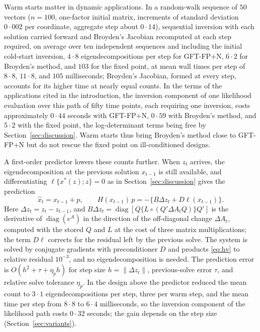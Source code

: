 \documentclass[11pt]{article}
\newcommand{\diag}{\operatorname{diag}}
\begin{document}
Warm starts matter in dynamic applications. In a random-walk sequence of $50$
vectors ($n=100$, one-factor initial matrix, increments of standard
deviation $0{\cdot}002$ per coordinate, aggregate step about
$0{\cdot}14$), sequential inversion with each solution carried
forward and Broyden's Jacobian recomputed at each step required, on
average over ten independent sequences and including the initial
cold-start inversion,
$4{\cdot}8$ eigendecompositions per step for GFT-FP+N, $6{\cdot}2$
for Broyden's method, and $103$ for the fixed point, at mean wall
times per step of $8{\cdot}8$, $11{\cdot}8$, and $105$ milliseconds;
Broyden's Jacobian, formed at every step, accounts for its higher time
at nearly equal counts. In the terms of the applications cited in the
introduction, the inversion component of one likelihood evaluation
over this path of fifty time points, each requiring one inversion,
costs approximately $0{\cdot}44$ seconds with GFT-FP+N, $0{\cdot}59$
with Broyden's method, and $5{\cdot}2$ with the fixed point, the
log-determinant terms being free by Section~\ref{sec:discussion}.
Warm starts thus bring Broyden's method close to GFT-FP+N but do not
rescue the fixed point on ill-conditioned designs.

A first-order predictor lowers these counts further. When $z_t$
arrives, the eigendecomposition at the previous solution $x_{t-1}$ is
still available, and differentiating $\ell\{x^{\ast}(z);z\}=0$ as in
Section~\ref{sec:discussion} gives the prediction
\begin{equation}\label{eq:pred}
\hat{x}_t=x_{t-1}+p,\qquad
H(x_{t-1})\,p=-\{B\Delta z_t+D\ell(x_{t-1})\}.
\end{equation}
Here $\Delta z_t=z_t-z_{t-1}$, and
$B\Delta z_t=\diag[Q\{L\circ(Q'\Delta A_tQ)\}Q']$ is the derivative of
$\diag(e^{A})$ in the direction of the off-diagonal change
$\Delta A_t$, computed with the stored $Q$ and $L$ at the cost of three
matrix multiplications; the term $D\ell$ corrects for the residual
left by the previous solve. The system is solved by conjugate
gradients with preconditioner $D$ and products \eqref{eq:hv} to
relative residual $10^{-3}$, and no eigendecomposition is needed. The
prediction error is $O(h^{2}+\tau+\eta_ph)$ for step size
$h=\|\Delta z_t\|$, previous-solve error $\tau$, and relative solve
tolerance $\eta_p$. In the design above the predictor reduced the mean
count to $3{\cdot}1$ eigendecompositions per step, three per warm
step, and the mean time per step from $8{\cdot}8$ to $6{\cdot}4$
milliseconds, so the inversion component of the likelihood path costs
$0{\cdot}32$ seconds; the gain depends on the step size
(Section~\ref{sec:variants}).
\end{document}
